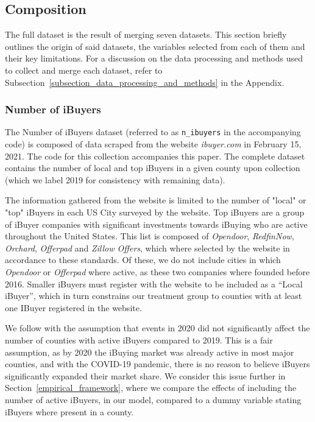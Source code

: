 \subsection{Composition}\label{subsection_composition}
The full dataset is the result of merging seven datasets. This section briefly outlines the origin of said datasets, the variables selected from each of them and their key limitations. For a discussion on the data processing and methods used to collect and merge each dataset, refer to Subsection~\ref{subsection_data_processing_and_methods} in the Appendix.

\subsubsection{Number of iBuyers}\label{subsubsec_n_ibuyers}
The Number of iBuyers dataset (referred to as \lstinline{n_ibuyers} in the accompanying code) is composed of data scraped from the website \textit{ibuyer.com}\cite{ibuyer} in February 15, 2021. The code for this collection accompanies this paper. The complete dataset contains the number of local and top iBuyers in a given county upon collection (which we label 2019 for consistency with remaining data). 

The information gathered from the website is limited to the number of "local" or "top" iBuyers in each US City surveyed by the website. Top iBuyers are a group of iBuyer companies with significant investments towards iBuying who are active throughout the United States. This list is composed of \textit{Opendoor}, \textit{RedfinNow}, \textit{Orchard}, \textit{Offerpad} and \textit{Zillow Offers}, which where selected by the website in accordance to these standards. Of these, we do not include cities in which \textit{Opendoor} or \textit{Offerpad} where active, as these two companies where founded before 2016. Smaller iBuyers must register with the website to be included as a ``Local iBuyer'', which in turn constrains our treatment group to counties with at least one IBuyer registered in the website. 

We follow with the assumption that events in 2020 did not significantly affect the number of counties with active iBuyers compared to 2019. This is a fair assumption, as by 2020 the iBuying market was already active in most major counties, and with the COVID-19 pandemic, there is no reason to believe iBuyers significantly expanded their market share. We consider this issue further in Section~\ref{empirical_framework}, where we compare the effects of including the number of active iBuyers, in our model, compared to a dummy variable stating iBuyers where present in a county.

